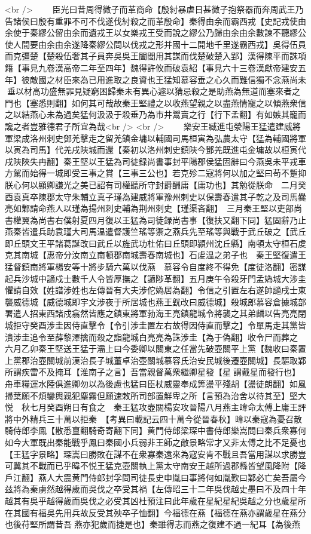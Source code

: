 <br />
　　臣光曰昔周得微子而革商命【殷紂暴虐日甚微子抱祭器而奔周武王乃告諸侯曰殷有重罪不可不伐遂伐紂殺之而革殷命】秦得由余而霸西戎【史記戎使由余使于秦繆公留由余而遺戎王以女樂戎王受而說之繆公乃歸由余由余數諫不聽繆公使人間要由余由余遂降秦繆公問以伐戎之形并國十二開地千里遂霸西戎】吳得伍員而克彊楚【楚殺伍奢其子員奔吳吳王闔閭用其謀而伐楚破楚入郢】漢得陳平而誅項籍【事見九卷漢高帝二年至四年】魏得許攸而破袁紹【事見六十三卷漢獻帝建安五年】彼敵國之材臣來為已用進取之良資也王猛知慕容垂之心久而難信獨不念燕尚未垂以材高功盛無罪見疑窮困歸秦未有異心遽以猜忌殺之是助燕為無道而塞來者之門也【塞悉則翻】如何其可哉故秦王堅禮之以收燕望親之以盡燕情寵之以傾燕衆信之以結燕心未為過矣猛何汲汲于殺垂乃為市井鬻賣之行【行下孟翻】有如嫉其寵而讒之者豈雅德君子所宜為哉<br />
<br />
　　樂安王臧進屯滎陽王猛遣建威將軍梁成洛州刺史鄧羌擊走之留羌鎮金墉以輔國司馬桓寅為弘農太守【猛為輔國將軍以寅為司馬】代羌戌陜城而還【秦初以洛州刺史鎮陜今鄧羌既進屯金墉故以桓寅代戌陜陜失冉翻】秦王堅以王猛為司徒録尚書事封平陽郡侯猛固辭曰今燕吳未平戎車方駕而始得一城即受三事之賞【三事三公也】若克殄二寇將何以加之堅曰苟不蹔抑朕心何以顯卿謙光之美已詔有司權聽所守封爵酬庸【庸功也】其勉從朕命　二月癸酉袁真卒陳郡太守朱輔立真子瑾為建威將軍豫州刺史以保壽春遣其子乾之及司馬爨亮如鄴請命燕人以瑾為揚州刺史輔為荆州刺史【瑾渠吝翻】　三月秦王堅以吏部尚書權翼為尚書右僕射夏四月復以王猛為司徒録尚書事【復扶又翻下同】猛固辭乃止　燕秦皆遣兵助袁瑾大司馬温遣督護竺瑤等禦之燕兵先至瑤等與戰于武丘破之【武丘即丘頭文王平諸葛誕改曰武丘以旌武功杜佑曰丘頭即潁州沈丘縣】南頓太守桓石䖍克其南城【惠帝分汝南立南頓郡南城壽春南城也】石䖍温之弟子也　秦王堅復遣王猛督鎮南將軍楊安等十將步騎六萬以伐燕　慕容令自度終不得免【度徒洛翻】密謀起兵沙城中讁戍士數千人令皆厚撫之【讁陟革翻】五月庚午令殺牙門孟媯城大涉圭懼請自效【姓譜涉姓也左傳晉有大夫涉佗媯居為翻】令信之引置左右遂帥讁戌士東襲威德城【威德城即宇文涉夜于所居城也燕王皝改曰威德城】殺城郎慕容倉據城部署遣人招東西諸戍翕然皆應之鎮東將軍勃海王亮鎮龍城令將襲之其弟麟以告亮亮閉城拒守癸酉涉圭因侍直擊令【令引涉圭置左右故得因侍直而擊之】令單馬走其黨皆潰涉圭追令至薛黎澤擒而殺之詣龍城白亮亮為誅涉圭【為于偽翻】收令尸而葬之　六月乙卯秦王堅送王猛于灞上曰今委卿以關東之任當先破壺關平上黨【魏收曰秦置上黨郡治壺關城前漢治長子城董卓治壺關城慕容氏治安民城後遷壺關城】長驅取鄴所謂疾雷不及掩耳【淮南子之言】吾當親督萬衆繼卿星發【星謂戴星而發行也】舟車糧運水陸俱進卿勿以為後慮也猛曰臣杖威靈奉成筭盪平殘胡【盪徒朗翻】如風掃葉願不煩鑾輿親犯塵霧但願速敇所司部置鮮卑之所【言預為治舍以待其至】堅大悦　秋七月癸酉朔日有食之　秦王猛攻壺關楊安攻晉陽八月燕主暐命太傅上庸王評將中外精兵三十萬以拒秦　【考異曰載記云四十萬今從晉春秋】暐以秦寇為憂召散騎侍郎李鳳【散悉亶翻騎奇寄翻下同】黄門侍郎梁琛中書侍郎樂嵩問曰秦兵衆寡何如今大軍既出秦能戰乎鳳曰秦國小兵弱非王師之敵景略常才又非太傅之比不足憂也【王猛字景略】琛嵩曰勝敗在謀不在衆寡秦遠來為寇安肯不戰且吾當用謀以求勝豈可冀其不戰而已乎暐不悦王猛克壺關執上黨太守南安王越所過郡縣皆望風降附【降戶江翻】燕人大震黄門侍郎封孚問司徒長史申胤曰事將何如胤歎曰鄴必亡矣吾屬今兹將為秦虜然越得歲而吳伐之卒受其禍【左傳昭三十二年吳伐越史墨曰不及四十年越其有吳乎越得歲而吳伐之必受其凶杜預注曰此年歲在星紀星紀吳越之分也歲星所在其國有福吳先用兵故反受其殃卒子恤翻】今福德在燕【福德在燕亦謂歲星在燕分也後苻堅所謂昔吾燕亦犯歲而捷是也】秦雖得志而燕之復建不過一紀耳【為後燕
